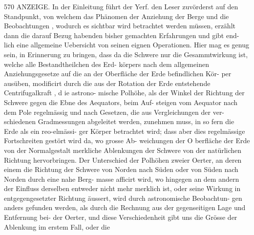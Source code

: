 \documentclass[12pt,a4paper]{article}
\begin{document}
\newpage
570 ANZEIGE.\newline
In der Einleitung führt der Yerf. den Leser zuvörderst auf den Standpunkt, von welchem das\newline
Phänomen der Anziehung der Berge und die Beobachtungen , wodurch es sichtbar wird betrachtet\newline
werden müssen, erzählt dann die darauf Bezug habenden bisher gemachten Erfahrungen und gibt end-\newline
lich eine allgemeine Uebersicht von seinen eignen Operationen. Hier mag es genug sein, in Erinnerung\newline
zu bringen, dass da die Schwere nur die Gesammtwirkung ist, welche alle Bestandtheilchen des Erd-\newline
körpers nach dem allgemeinen Anziehungsgesetze auf die an der Oberfläche der Erde befindlichen Kör-\newline
per ausüben, modificirt durch die aus der Rotation der Erde entstehende Centrifugalkraft , d ie astrono-\newline
mische Polhöhe, als der Winkel der Richtung der Schwere gegen die Ebne des Aequators, beim Auf-\newline
steigen vom Aequator nach dem Pole regelmässig und nach Gesetzen, die aus Vergleichungen der ver-\newline
schiedenen Gradmessungen abgeleitet werden, zunehmen muss, in so fern die Erde als ein reo-elmässi-\newline
ger Körper betrachtet wird; dass aber dies regelmässige Fortschreiten gestört wird da, wo grosse Ab-\newline
weichungen der O berfläche der Erde von der Normalgestalt merkliche Ablenkungen der Schwere von\newline
der natürlichen Richtung hervorbringen. Der Unterschied der Polhöhen zweier Oerter, an deren einem\newline
die Richtung der Schwere von Norden nach Süden oder von Süden nach Norden durch eine nahe Berg-\newline
masse afficirt wird, wo hingegen an dem andern der Einfluss derselben entweder nicht mehr merklich\newline
ist, oder seine Wirkung in entgegengesetzter Richtung äussert, wird durch astronomische Beobachtun-\newline
gen anders gefunden werden, als durch die Rechnung aus der gegenseitigen Lage und Entfernung bei-\newline
der Oerter, und diese Verschiedenheit gibt uns die Grösse der Ablenkung im erstem Fall, oder die\newline
\end{document}
